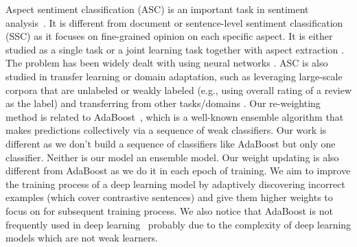Aspect sentiment classification (ASC) \cite{hu2004mining} is an important task in sentiment analysis~\cite{pang2002thumbs,liu2015sentiment}. It is different from document or sentence-level sentiment classification (SSC) \cite{pang2002thumbs,kim2014convolutional,he2011self,he2011automatically} as it focuses on fine-grained opinion on each specific aspect. It is either studied as a single task or a joint learning task together with aspect extraction \cite{wang2017coupled,li2017deep,li2018unified}. The problem has been widely dealt with using neural networks \cite{dong2014adaptive,nguyen-shirai-2015-phrasernn,li2018transformation}.
ASC is also studied in transfer learning or domain adaptation, such as leveraging large-scale corpora that are unlabeled or weakly labeled (e.g., using overall rating of a review as the label) \cite{xu_bert2019,he-EtAl:2018} and transferring from other tasks/domains \cite{li2018exploiting,wang2018lifelong,wang2018target}. 
Our re-weighting method is related to AdaBoost~\cite{freund1997decision}, which is a well-known ensemble algorithm that makes predictions collectively via a sequence of weak classifiers. 
Our work is different as we don’t build a sequence of classifiers like AdaBoost but only one classifier. Neither is our model an ensemble model. Our weight updating is also different from AdaBoost as we do it in each epoch of training.
We aim to improve the training process of a deep learning model by adaptively discovering incorrect examples (which cover contrastive sentences) and give them higher weights to focus on for subsequent training process. 
We also notice that AdaBoost is not frequently used in deep learning~\cite{schwenk2000boosting,mosca2017deep} probably due to the complexity of deep learning models which are not weak learners.


